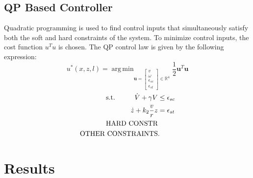 \documentclass[journal]{IEEEtran}
\DeclareMathOperator*{\argmin}{arg\,min}
\begin{document}
\subsection{QP Based Controller}
Quadratic programming is used to find control inputs that simultaneously satisfy both the soft and hard constraints of the system. To minimize control inputs, the cost function $u^Tu$ is chosen. The QP control law is given by the following expression:
\begin{equation}
u^*(x,z,l) = \argmin_{\textbf{u}=
\left[\begin{matrix}
v\\
\omega\\
\epsilon_{sc}\\
\epsilon_{st}
\end{matrix}\right]
\in \mathbb{R}^4}
\frac{1}{2}\textbf{u}^T\textbf{u} 
\end{equation}
\begin{align}
\text{ s.t.\hspace{1cm}}
\dot{V}+\gamma V & \leq\epsilon_{sc}\\
\dot{z}+k_2\frac{v}{r}z & =\epsilon_{st}\\
\text{HARD CONSTR}&\\
\text{OTHER CONSTRAINTS}&.
\end{align}

\section{Results}
%
\end{document}
